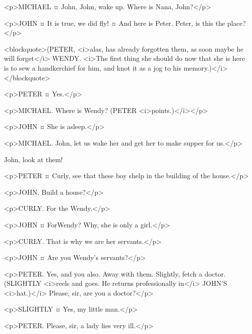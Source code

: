 
<p>MICHAEL ¤
John, John, wake up. Where is Nana, John?</p>

<p>JOHN ¤
It is true, we did fly!
¤
And here is Peter. Peter, is this the place?</p>

<blockquote>(PETER, <i>alas, has already forgotten them, as soon maybe he will forget</i> WENDY. <i>The first thing she should do now that she is here is to sew a handkerchief for him, and knot it as a jog to his memory.)</i></blockquote>

<p>PETER ¤
Yes.</p>

<p>MICHAEL. Where is Wendy? (PETER <i>points.)</i></p>

<p>JOHN ¤
She is asleep.</p>

<p>MICHAEL. John, let us wake her and get her to make supper for us.</p>


John, look at them! 

<p>PETER ¤
Curly, see that these boy shelp in the building of the house.</p>

<p>JOHN. Build a house?</p>

<p>CURLY. For the Wendy.</p>

<p>JOHN ¤
ForWendy? Why, she is only a girl.</p>

<p>CURLY. That is why we are her servants.</p>

<p>JOHN ¤
Are you Wendy's servants?</p>

<p>PETER. Yes, and you also. Away with them.
Slightly, fetch a doctor. (SLIGHTLY <i>reels and goes. He returns professionally in</i> JOHN'S <i>hat.)</i> Please, sir, are you a doctor?</p>

<p>SLIGHTLY ¤
Yes, my little man.</p>

<p>PETER. Please, sir, a lady lies very ill.</p>

